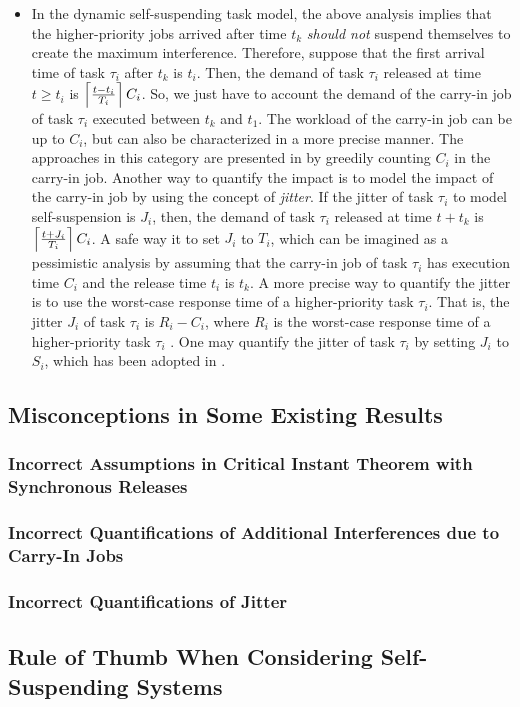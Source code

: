 \begin{itemize}
\begin{itemize}
\item In the dynamic self-suspending task model, the above analysis implies that the higher-priority jobs arrived after time $t_k$ \emph{should not} suspend themselves to create the maximum interference. Therefore, suppose that the first arrival time of task $\tau_i$ after $t_k$ is $t_i$. Then, the demand of task $\tau_i$ released at time $t \geq t_i$ is $\left\lceil{\frac{t-t_i}{T_i} }\right\rceil C_i$. So, we just have to account the demand of the carry-in job of task $\tau_i$ executed between $t_k$ and $t_1$. The workload of the carry-in job can be up to $C_i$, but can also be characterized in a more precise manner. The approaches in this category are presented in \cite{huangpass:dac2015,LiuChen:rtss2014} by greedily counting $C_i$ in the carry-in job. Another way to quantify the impact is to model the impact of the carry-in job by using the concept of \emph{jitter}. If the jitter of task $\tau_i$ to model self-suspension is $J_i$, then, the demand of task $\tau_i$ released at time $t+t_k$ is $\left\lceil{\frac{t+J_i}{T_i} }\right\rceil C_i$. A safe way it to set $J_i$ to $T_i$, which can be imagined as a pessimistic analysis by assuming that the carry-in job of task $\tau_i$ has execution time $C_i$ and the release time $t_i$ is $t_k$. A more precise way to quantify the jitter is to use the worst-case response time of a higher-priority task $\tau_i$. That is, the jitter $J_i$ of task $\tau_i$ is $R_i-C_i$, where $R_i$ is the worst-case response time of a higher-priority task $\tau_i$ \cite{huangpass:dac2015}. One may quantify the jitter of task $\tau_i$ by setting $J_i$ to $S_i$, which has been adopted in \cite{DBLP:conf/ecrts/AudsleyB04}.
\end{itemize}
\end{itemize}


\subsection{Misconceptions in Some Existing Results}
\subsubsection{Incorrect Assumptions in Critical Instant Theorem with Synchronous Releases}
\subsubsection{Incorrect Quantifications of Additional Interferences due to Carry-In Jobs}
\subsubsection{Incorrect Quantifications of Jitter}
\subsection{Rule of Thumb When Considering Self-Suspending Systems}
  
  
  
  
  
  
  
  
  
  
  
  
  
  
  
  